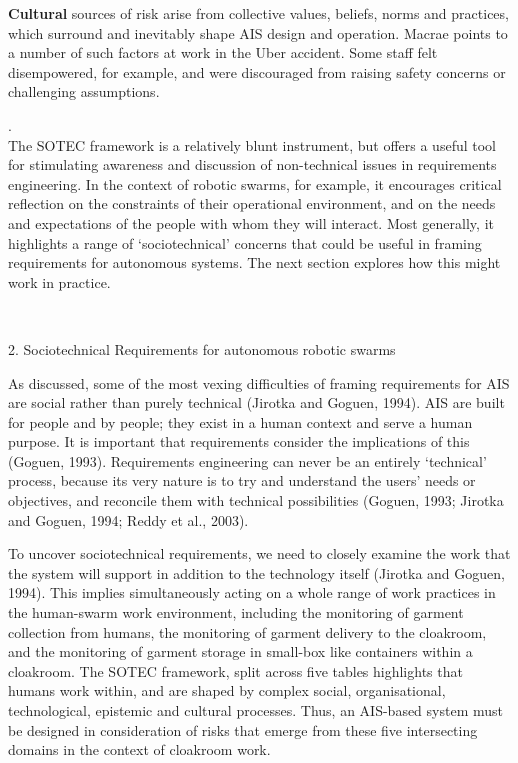 \documentclass[lettersize,journal]{IEEEtran}
\begin{document}
\textbf{Cultural} sources of risk arise from collective values, beliefs, norms and practices, which surround and inevitably shape AIS design and operation. Macrae points to a number of such factors at work in the Uber accident. Some staff felt disempowered, for example, and were discouraged from raising safety concerns or challenging assumptions.

.\\The SOTEC framework is a relatively blunt instrument, but offers a useful tool for stimulating awareness and discussion of non-technical issues in requirements engineering. In the context of robotic swarms, for example, it encourages critical reflection on the constraints of their operational environment, and on the needs and expectations of the people with whom they will interact. Most generally, it highlights a range of ‘sociotechnical’ concerns that could be useful in framing requirements for autonomous systems. The next section explores how this might work in practice.

\


2. Sociotechnical Requirements for autonomous robotic swarms

As discussed, some of the most vexing difficulties of framing requirements for AIS are social rather than purely technical (Jirotka and Goguen, 1994). AIS are built for people and by people; they exist in a human context and serve a human purpose. It is important that requirements consider the implications of this (Goguen, 1993). Requirements engineering can never be an entirely ‘technical’ process, because its very nature is to try and understand the users’ needs or objectives, and reconcile them with technical possibilities (Goguen, 1993; Jirotka and Goguen, 1994; Reddy et al., 2003). 

To uncover sociotechnical requirements, we need to closely examine the work that the system will support in addition to the technology itself (Jirotka and Goguen, 1994). This implies simultaneously acting on a whole range of work practices in the human-swarm work environment, including the monitoring of garment collection from humans, the monitoring of garment delivery to the cloakroom, and the monitoring of garment storage in small-box like containers within a cloakroom. The SOTEC framework, split across five tables highlights that humans work within, and are shaped by complex social, organisational, technological, epistemic and cultural processes. Thus, an AIS-based system must be designed in consideration of risks that emerge from these five intersecting domains in the context of cloakroom work. 
\end{document}
